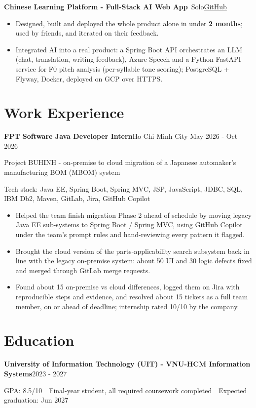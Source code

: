 \documentclass[10pt, a4paper]{article}
\newcommand{\entry}[2]{\textbf{#1}\hfill#2\par}
\newcommand{\subentry}[2]{{\color{MutedText}#1}\hfill{\color{MutedText}#2}\par}
\newcommand{\project}[3]{\textbf{#1}\,{\color{MutedText}\textbar{} #2}\hfill\href{#3}{GitHub}\par}
\newcommand{\techstack}[1]{{\color{MutedText}Tech stack: #1}\par}
\begin{document}
\vspace{2pt}
\project{Chinese Learning Platform - Full-Stack AI Web App}{Solo}{https://github.com/minhphuong150505/Web_Chinese_Learning-}
\begin{itemize}
  \item Designed, built and deployed the whole product alone in under \textbf{2 months}; used by friends, and iterated on their feedback.
  \item Integrated AI into a real product: a Spring Boot API orchestrates an LLM (chat, translation, writing feedback), Azure Speech and a Python FastAPI service for F0 pitch analysis (per-syllable tone scoring); PostgreSQL + Flyway, Docker, deployed on GCP over HTTPS.
\end{itemize}

\section{Work Experience}
\entry{FPT Software \textbar{} Java Developer Intern}{Ho Chi Minh City \textbar{} May 2026 - Oct 2026}
\subentry{Project BUHINH - on-premise to cloud migration of a Japanese automaker's manufacturing BOM (MBOM) system}{}
\techstack{Java EE, Spring Boot, Spring MVC, JSP, JavaScript, JDBC, SQL, IBM Db2, Maven, GitLab, Jira, GitHub Copilot}
\begin{itemize}
  \item Helped the team finish migration Phase 2 ahead of schedule by moving legacy Java EE sub-systems to Spring Boot / Spring MVC, using GitHub Copilot under the team's prompt rules and hand-reviewing every pattern it flagged.
  \item Brought the cloud version of the parts-applicability search subsystem back in line with the legacy on-premise system: about 50 UI and 30 logic defects fixed and merged through GitLab merge requests.
  \item Found about 15 on-premise vs cloud differences, logged them on Jira with reproducible steps and evidence, and resolved about 15 tickets as a full team member, on or ahead of deadline; internship rated 10/10 by the company.
\end{itemize}

\section{Education}
\entry{University of Information Technology (UIT) - VNU-HCM \textbar{} Information Systems}{2023 - 2027}
GPA: 8.5/10 \,\textbar\, Final-year student, all required coursework completed \,\textbar\, Expected graduation: Jun 2027\par
\end{document}
